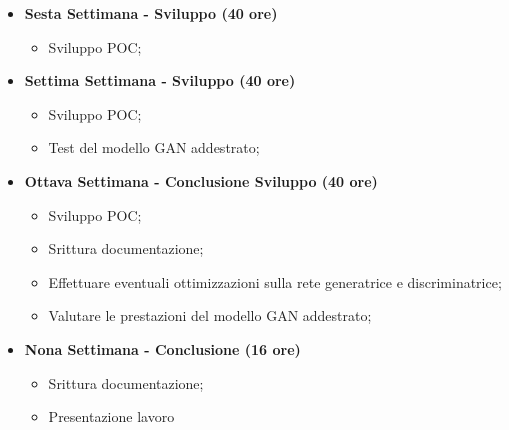 {\begin{itemize}
\begin{itemize}
                  \item Raccogliere un dataset appropriato per l'addestramento del GAN;
                  \item Preprocessare il dataset per adattarlo al formato richiesto dal framework;
              \end{itemize}
        \item \textbf{Sesta Settimana - Sviluppo (40 ore)}
              \begin{itemize}
                  \item Sviluppo POC;
              \end{itemize}
        \item \textbf{Settima Settimana - Sviluppo (40 ore)}
              \begin{itemize}
                  \item Sviluppo POC;
                  \item Test del modello GAN addestrato;
              \end{itemize}
        \item \textbf{Ottava Settimana - Conclusione Sviluppo (40 ore)}
              \begin{itemize}
                  \item Sviluppo POC;
                  \item Srittura documentazione;
                  \item Effettuare eventuali ottimizzazioni sulla rete generatrice e discriminatrice;
                  \item Valutare le prestazioni del modello GAN addestrato;
              \end{itemize}

        \item \textbf{Nona Settimana - Conclusione (16 ore)}
              \begin{itemize}
                  \item Srittura documentazione;
                  \item Presentazione lavoro
              \end{itemize}
    \end{itemize}
}



\newcommand{\totaleOre}{312}

\newcommand{\obiettiviObbligatori}{
    \item \underline{\textit{O01}}: Comprendere il funzionamento teorico dei GAN e le loro applicazioni per la generazione di immagini.;
    \item \underline{\textit{O02}}: Sviluppare la capacità di autogestirsi e affrontare argomenti sull'argomento GAN attraverso l'autoformazione;
    \item \underline{\textit{O03}}: Sviluppo di un POC dimostrativo;

}

